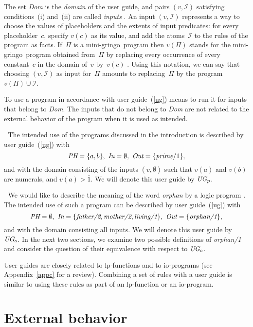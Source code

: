 \documentclass{new_tlp}
\def\gringo{{\sc gringo}}
\def\num{\overline}
\newcommand{\I}{\mathcal{I}}
\begin{document}
The set \emph{Dom} is the \emph{domain} of the user guide, and
pairs $(v,\I)$ satisfying conditions~(i) and~(ii) are called \emph{inputs}
\cite[Section~5.2]{fan20}.
An input $(v,\I)$ represents a way to choose the values of
placeholders and the extents of input predicates: for every
placeholder~$c$, specify $v(c)$ as its value, and add the atoms~$\I$
to the rules of the program as facts.  If~$\Pi$ is a mini-\gringo\ program
then $v(\Pi)$ stands for the mini-\gringo\ program obtained from~$\Pi$ by
replacing every occurrence of every constant~$c$ in the domain of~$v$
by~$v(c)$
\cite[Section~2.4]{fan22}.  Using this notation, we can say that
choosing $(v,\I)$ as input for~$\Pi$ amounts to
replacing~$\Pi$ by the program $v(\Pi)\cup\I$.

To use a program in accordance with user guide~(\ref{ug})
means to run it for inputs that belong to \emph{Dom}.  The
inputs that do not belong to \emph{Dom} are not related to the
external behavior of the program when it is used as intended.

\medskip{}$\;$ The intended use of the
programs discussed in the introduction is
described by user guide~(\ref{ug}) with
$$\emph{PH} = \{a,b\},\ \emph{In} = \emptyset,\
  \emph{Out} = \{\emph{prime}/1\},$$
and with the domain consisting of the inputs $(v,\emptyset)$ such that
$v(a)$ and $v(b)$ are numerals, and $v(a)>\num 1$.  We will denote this
user guide by $\emph{UG}_p$.

\medskip{}$\;$ We would like to describe the meaning
of the word \emph{orphan} by a logic program \cite[Section ??]{gel14}.
The intended use of such a
program can be described by user guide~(\ref{ug}) with
$$\emph{PH} = \emptyset,\
\emph{In} = \{\emph{father/2},\emph{mother/2}, \emph{living/1}\},\
\emph{Out} = \{\emph{orphan/1}\},$$
and with the domain consisting all inputs.    We will denote this
user guide by~$\emph{UG}_o$.  In the next two sections, we examine
two possible definitions of \hbox{\emph{orphan/1}}
and consider the question of their
equivalence with respect to $\emph{UG}_o$.
\medskip

User guides are closely related to
lp-functions \cite[Section~2]{gel02}
and to io-programs \cite[Section~5]{fan20} (see Appendix~\ref{appc} for
a review).
    Combining a set of rules with a user guide is similar to using these
    rules as part of
    an lp-function or an io-program.

\section{External behavior}
\end{document}
